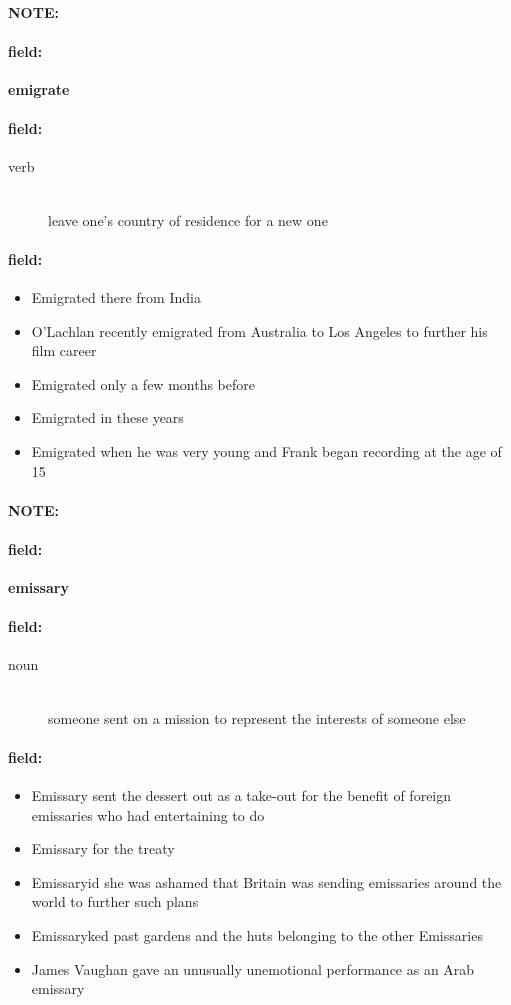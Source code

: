 \documentclass[12pt]{article}
\newenvironment{note}{\paragraph{NOTE:}}{}
\newenvironment{field}{\paragraph{field:}}{}
\begin{document}
\begin{note}
\begin{field}
\textbf{\large emigrate}
\end{field}


\begin{field}
\begin{description}
\item[verb] \hfill \\ 
leave one's country of residence for a new one

\end{description}
\end{field}

\begin{field}
\begin{itemize}
\item Emigrated there from India
\item O'Lachlan recently emigrated from Australia to Los Angeles to further his film career
\item Emigrated only a few months before
\item Emigrated in these years
\item Emigrated when he was very young and Frank began recording at the age of 15
\end{itemize}
\end{field}
\end{note}
\begin{note}
\begin{field}
\textbf{\large emissary}
\end{field}


\begin{field}
\begin{description}
\item[noun] \hfill \\ 
someone sent on a mission to represent the interests of someone else

\end{description}
\end{field}

\begin{field}
\begin{itemize}
\item Emissary sent the dessert out as a take-out for the benefit of foreign emissaries who had entertaining to do
\item Emissary for the treaty
\item Emissaryid she was ashamed that Britain was sending emissaries around the world to further such plans
\item Emissaryked past gardens and the huts belonging to the other Emissaries
\item James Vaughan gave an unusually unemotional performance as an Arab emissary
\end{itemize}
\end{field}
\end{note}
\end{document}
